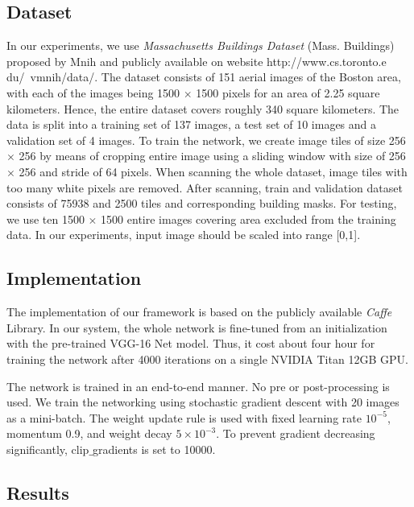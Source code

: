 \documentclass[runningheads]{llncs}
\begin{document}
\subsection{Dataset}
In our experiments, we use \textit{Massachusetts Buildings Dataset} (Mass. Buildings) proposed by Mnih \cite{Mnih2013Machine} and publicly available on website
http://www.cs.toronto.e
du/~vmnih/data/. The dataset consists of 151 aerial images of the Boston area, with each of the images being 1500 $\times$ 1500 pixels for an area of 2.25 square
kilometers. Hence, the entire dataset covers roughly 340 square kilometers. The data is split into a training set of 137 images, a test set of 10 images and
a validation set of 4 images. To train the network, we create image tiles of size 256 $\times$ 256 by means of cropping entire image using a sliding window with size of 256 $\times$ 256 and stride of 64 pixels. When scanning the whole dataset, image tiles with too many white pixels are removed. After scanning, train and validation dataset consists of 75938 and 2500 tiles and corresponding building masks. For testing, we use ten 1500 $\times$ 1500 entire images covering area excluded from the training data. 
In our experiments, input image should be scaled into range [0,1]. 

\subsection{Implementation}
The implementation of our framework is based on the publicly  available \textit{Caffe} \cite{Jia2014Caffe} Library. In our system, the whole network is fine-tuned from an initialization with the pre-trained VGG-16 Net model. Thus, it cost about four hour for training the network after 4000 iterations on a single NVIDIA Titan 12GB GPU.

The network is trained in an end-to-end manner. No pre or post-processing is used. We train the networking using stochastic gradient descent with 20 images as a mini-batch. The weight update rule is used with fixed learning rate $10^{-5}$, momentum 0.9, and weight decay $5\times 10^{-3}$. To prevent gradient decreasing significantly, clip$\_$gradients is set to 10000. 

\subsection{Results}
 
\end{document}
